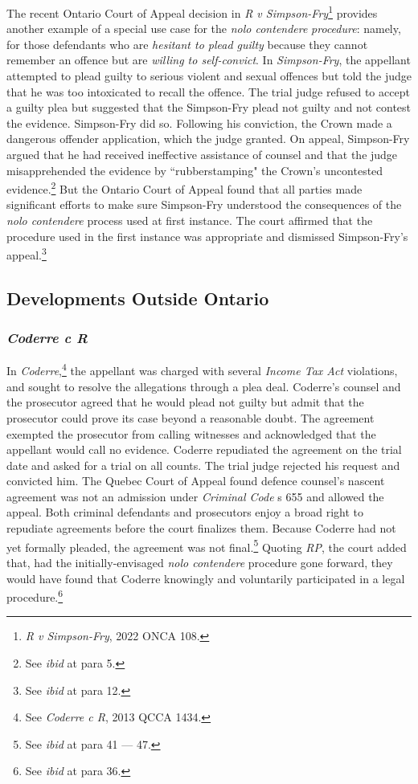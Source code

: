 The recent Ontario Court of Appeal decision in \textit{R v Simpson-Fry}\footnote{\textit{R v Simpson-Fry}, 2022 ONCA 108.} provides another example of a special use case for the \textit{nolo contendere} \textit{procedure}: namely, for those defendants who are \textit{hesitant to plead guilty} because they cannot remember an offence but are \textit{willing to self-convict}. In \textit{Simpson-Fry}, the appellant attempted to plead guilty to serious violent and sexual offences but told the judge that he was too intoxicated to recall the offence. The trial judge refused to accept a guilty plea but suggested that the Simpson-Fry plead not guilty and not contest the evidence. Simpson-Fry did so. Following his conviction, the Crown made a dangerous offender application, which the judge granted. On appeal, Simpson-Fry argued that he had received ineffective assistance of counsel and that the judge misapprehended the evidence by ``rubberstamping" the Crown's uncontested evidence.\footnote{See \textit{ibid} at para 5.} But the Ontario Court of Appeal found that all parties made significant efforts to make sure Simpson-Fry understood the consequences of the \textit{nolo contendere} process used at first instance. The court affirmed that the procedure used in the first instance was appropriate and dismissed Simpson-Fry's appeal.\footnote{See \textit{ibid} at para 12.}

\subsection{Developments Outside Ontario}
\subsubsection{\textit{Coderre c R}}
In \textit{Coderre},\footnote{See \textit{Coderre c R}, 2013 QCCA 1434.} the appellant was charged with several \textit{Income Tax Act} violations, and sought to resolve the allegations through a plea deal. Coderre's counsel and the prosecutor agreed that he would plead not guilty but admit that the prosecutor could prove its case beyond a reasonable doubt. The agreement exempted the prosecutor from calling witnesses and acknowledged that the appellant would call no evidence. Coderre repudiated the agreement on the trial date and asked for a trial on all counts. The trial judge rejected his request and convicted him. The Quebec Court of Appeal found defence counsel's nascent agreement was not an admission under \textit{Criminal Code} s 655 and allowed the appeal. Both criminal defendants and prosecutors enjoy a broad right to repudiate agreements before the court finalizes them. Because Coderre had not yet formally pleaded, the agreement was not final.\footnote{See \textit{ibid} at para 41 — 47.} Quoting \textit{RP}, the court added that, had the initially-envisaged \textit{nolo contendere} procedure gone forward, they would have found that Coderre knowingly and voluntarily participated in a legal procedure.\footnote{See \textit{ibid} at para 36.}

